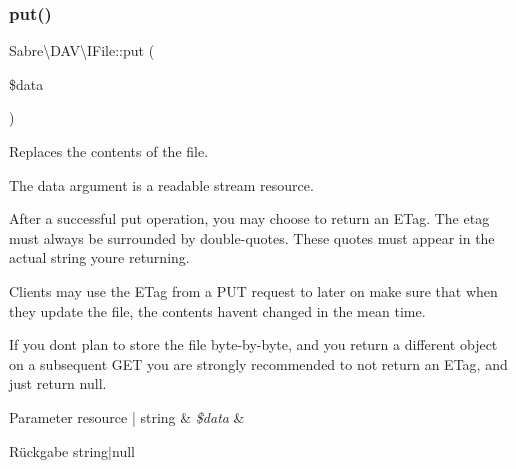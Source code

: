\subsubsection{\texorpdfstring{put()}{put()}}
{\footnotesize\ttfamily Sabre\textbackslash{}\+D\+A\+V\textbackslash{}\+I\+File\+::put (\begin{DoxyParamCaption}\item[{}]{\$data }\end{DoxyParamCaption})}

Replaces the contents of the file.

The data argument is a readable stream resource.

After a successful put operation, you may choose to return an E\+Tag. The etag must always be surrounded by double-\/quotes. These quotes must appear in the actual string you\textquotesingle{}re returning.

Clients may use the E\+Tag from a P\+UT request to later on make sure that when they update the file, the contents haven\textquotesingle{}t changed in the mean time.

If you don\textquotesingle{}t plan to store the file byte-\/by-\/byte, and you return a different object on a subsequent G\+ET you are strongly recommended to not return an E\+Tag, and just return null.


\begin{DoxyParams}[1]{Parameter}
resource | string & {\em \$data} & \\
\hline
\end{DoxyParams}
\begin{DoxyReturn}{Rückgabe}
string$\vert$null 
\end{DoxyReturn}


